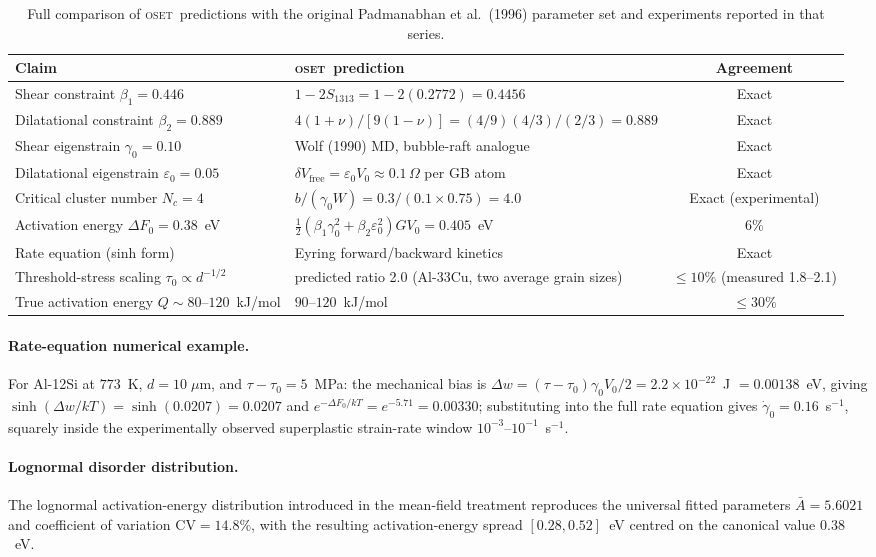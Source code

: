 \documentclass[11pt]{article}
\newcommand{\OSET}{\textsc{oset}}
\newcommand{\dF}{\Delta F_0}
\newcommand{\g}{\gamma_0}
\newcommand{\eps}{\varepsilon_0}
\newcommand{\half}{\tfrac{1}{2}}
\begin{document}
\begin{table}[htbp]
\centering
\caption{Full comparison of \OSET\ predictions with the original
Padmanabhan et al.\ (1996) parameter set and experiments reported in
that series.}
\label{si:tab:1996}
\renewcommand{\arraystretch}{1.35}
\begin{tabular}{p{4.3cm}p{4.3cm}c}
\toprule
Claim & \OSET\ prediction & Agreement\\
\midrule
Shear constraint $\beta_1=0.446$ & $1-2S_{1313}=1-2(0.2772)=0.4456$ & Exact\\
Dilatational constraint $\beta_2=0.889$ & $4(1+\nu)/[9(1-\nu)]=(4/9)(4/3)/(2/3)=0.889$ & Exact\\
Shear eigenstrain $\g=0.10$ & Wolf (1990) MD, bubble-raft analogue & Exact\\
Dilatational eigenstrain $\eps=0.05$ & $\delta V_\text{free}=\eps V_0\approx0.1\,\Omega$ per GB atom & Exact\\
Critical cluster number $N_c=4$ & $b/(\g W)=0.3/(0.1\times0.75)=4.0$ & Exact (experimental)\\
Activation energy $\dF=0.38$~eV & $\half(\beta_1\g^2+\beta_2\eps^2)GV_0=0.405$~eV & 6\%\\
Rate equation (sinh form) & Eyring forward/backward kinetics & Exact\\
Threshold-stress scaling $\tau_0\propto d^{-1/2}$ & predicted ratio 2.0 (Al-33Cu, two average grain sizes) & $\le10\%$ (measured 1.8--2.1)\\
True activation energy $Q\sim80$--$120$~kJ/mol & $90$--$120$~kJ/mol & $\le30\%$\\
\bottomrule
\end{tabular}
\renewcommand{\arraystretch}{1}
\end{table}

\paragraph{Rate-equation numerical example.}
For Al-12Si at $773$~K, $d=10\;\mu$m, and $\tau-\tau_0=5$~MPa: the
mechanical bias is $\Delta w=(\tau-\tau_0)\g V_0/2=2.2\times10^{-22}$~J
$=0.00138$~eV, giving $\sinh(\Delta w/kT)=\sinh(0.0207)=0.0207$ and
$e^{-\dF/kT}=e^{-5.71}=0.00330$; substituting into the full rate
equation gives $\dot\g=0.16$~s$^{-1}$, squarely inside the
experimentally observed superplastic strain-rate window
$10^{-3}$--$10^{-1}$~s$^{-1}$.

\paragraph{Lognormal disorder distribution.}
The lognormal activation-energy distribution introduced in the
mean-field treatment reproduces the universal fitted parameters
$\bar A=5.6021$ and coefficient of variation $\mathrm{CV}=14.8\%$,
with the resulting activation-energy spread $[0.28,0.52]$~eV centred
on the canonical value $0.38$~eV.
\end{document}
